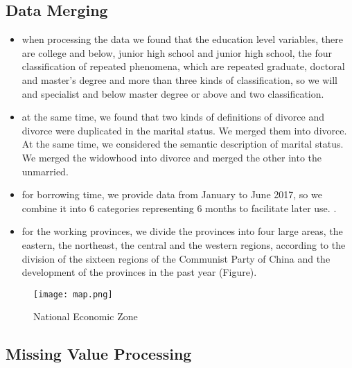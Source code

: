 \documentclass{mcmthesis}
\begin{document}
\subsection{Data Merging}
\begin{itemize}
\item when processing the data we found that the education level variables, there are college and below, junior high school and junior high school, the four classification of repeated phenomena, which are repeated graduate, doctoral and master's degree and more than three kinds of classification, so we will and specialist and below master degree or above and two classification.
\item at the same time, we found that two kinds of definitions of divorce and divorce were duplicated in the marital status. We merged them into divorce. At the same time, we considered the semantic description of marital status. We merged the widowhood into divorce and merged the other into the unmarried.
\item for borrowing time, we provide data from January to June 2017, so we combine it into 6 categories representing 6 months to facilitate later use. .
\item for the working provinces, we divide the provinces into four large areas, the eastern, the northeast, the central and the western regions, according to the division of the sixteen regions of the Communist Party of China and the development of the provinces in the past year (Figure).
\end{itemize}

\begin{figure}[h]
\large
\centering
\texttt{[image: map.png]}
\caption{National Economic Zone} \label{fig:National Economic Zone}
\end{figure}

\subsection{Missing Value Processing}
\end{document}
